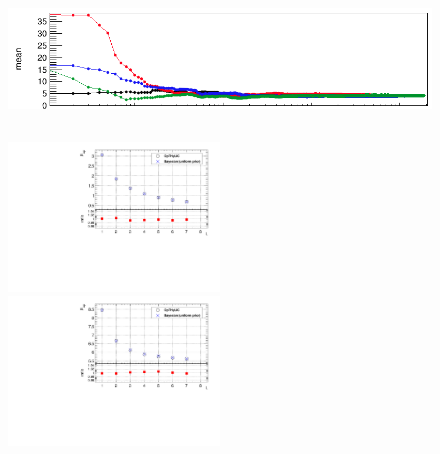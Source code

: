 \begin{frame}
\begin{columns}
\begin{column}{0.5\textwidth}
\pause

\begin{figure}[!htb]
\begin{center}
\vspace*{-1cm}
\hspace*{-0.3cm}
\includegraphics[width=1.1\textwidth]{Figures/Stat/cMu_cropped1.png}
\end{center}
\end{figure}

\end{column}
\end{columns}

\pause

\begin{figure}[!htb]
\begin{center}
\includegraphics[width=0.5\textwidth]{Figures/Stat/SingleChannelForComparisonWithUncertaintiesOnBkg.pdf}
\includegraphics[width=0.5\textwidth]{Figures/Stat/SingleChannelWithUncertaintiesOnBkg.pdf}
\end{center}
\end{figure}

\end{frame}


